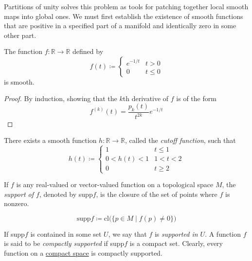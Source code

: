 \documentclass{article}
\newcounter{definition}[section]
\begin{document}
    Partitions of unity solves this problem as tools for patching together local smooth maps into global ones. We must first establish the existence of smooth functions that are positive in a specified part of a manifold and identically zero in some other part. 

    \begin{lemma}[Smoothness of $e^{-1/t}$]
      \label{thm:smoothness-of-e1t}
      The function $f: \mathbb{R} \to \mathbb{R}$ defined by 
      \begin{equation}
        f(t) \coloneqq \begin{cases}
                    e^{-1/t} & t > 0 \\
                    0 & t \leq 0
              \end{cases}
      \end{equation}
      is smooth. 
    \end{lemma}
    \begin{proof}
      By induction, showing that the $k$th derivative of $f$ is of the form
        \begin{equation}
          f^{(k)} (t) = \frac{p_k (t)}{t^{2k}} e^{-1/t}
        \end{equation}
    \end{proof}

    \begin{lemma}
      \label{thm:cutoff-function}
      There exists a smooth function $h: \mathbb{R} \to \mathbb{R}$, called the \textit{cutoff function}, such that 
      \begin{equation}
        h(t) \coloneqq \begin{cases}
                    1 & t \leq 1 \\
                    0 < h(t) < 1 & 1 < t < 2 \\
                    0 & t \geq 2
              \end{cases}
      \end{equation}
    \end{lemma}

    \begin{definition}[Support of $f$]
      \label{def:support-of-f}
      If $f$ is any real-valued or vector-valued function on a topological space $M$, the \textit{support of $f$}, denoted by supp$f$, is the closure of the set of points where $f$ is nonzero. 

        \begin{equation}
          \text{supp} f \coloneqq \text{cl} \big(\{p \in M\;|\; f(p) \neq 0\}\big)
        \end{equation}

      If supp$f$ is contained in some set $U$, we say that $f$ is \textit{supported in $U$}. A function $f$ is said to be \textit{compactly supported} if supp$f$ is a compact set. Clearly, every function on a \hyperref[pst-def:compact-space]{compact space} is compactly supported. 
    \end{definition}
\end{document}
